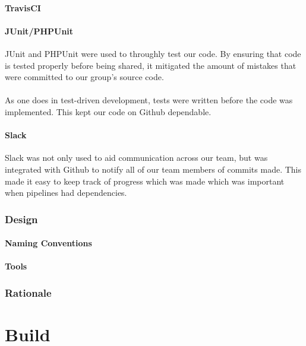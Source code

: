 \documentclass[12pt]{report}
\begin{document}
\subsection{TravisCI}

\subsection{JUnit/PHPUnit}
JUnit and PHPUnit were used to throughly test our code. By ensuring that code is tested properly before being shared, it mitigated the amount of mistakes that were committed to our group's source code.\\\\
As one does in test-driven development, tests were written before the code was implemented. This kept our code on Github dependable.

\subsection{Slack}
Slack was not only used to aid communication across our team, but was integrated with Github to notify all of our team members of commits made. This made it easy to keep track of progress which was made which was important when pipelines had dependencies.
\section{Design}

\subsection{Naming Conventions}

\subsection{Tools}

\section{Rationale}
\part{Build}
\end{document}
